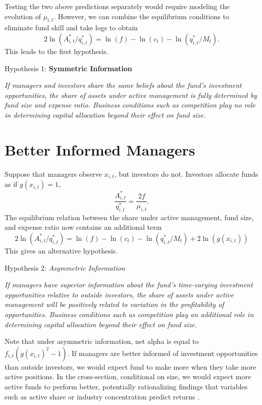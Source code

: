 \documentclass[openany]{book}
\theoremstyle{definition}
\theoremstyle{definition}
\theoremstyle{definition}
\theoremstyle{remark}
\begin{document}
Testing the two above predictions separately would require modeling the
evolution of \(\mu_{i,t}\). However, we can combine the equilibrium
conditions to eliminate fund skill and take logs to obtain
\begin{equation}
2\ln(A_{i,t}^\ast/q^\ast_{i,t})=\ln(f) - \ln(c_t) - \ln(q^\ast_{i,t}/M_t).
\label{eq:csEq}
\end{equation} This leads to the first hypothesis.

Hypothesis 1: \textbf{Symmetric Information}

\emph{If managers and investors share the same beliefs about the fund's
investment opportunities, the share of assets under active management is
fully determined by fund size and expense ratio. Business conditions
such as competition play no role in determining capital allocation
beyond their effect on fund size.}

\hypertarget{better-informed-managers}{%
\section{Better Informed Managers}\label{better-informed-managers}}

Suppose that managers observe \(x_{i,t}\), but investors do not.
Investors allocate funds as if \(g(x_{i,t})=1\), \begin{equation}
\frac{A_{i,t}^\ast}{q_{i,t}^\ast}=\frac{2f}{\mu_{i,t}}.
\end{equation} The equilibrium relation between the share under active
management, fund size, and expense ratio now contains an additional term
\begin{equation}
2\ln(A_{i,t}^\ast/q^\ast_{i,t})=\ln(f) - \ln(c_t) - \ln(q^\ast_{i,t}/M_t) + 2\ln(g(x_{i,t}))
\label{eq:csEQa}
\end{equation} This gives an alternative hypothesis.

Hypothesis 2: \emph{Asymmetric Information}

\emph{If managers have superior information about the fund's
time-varying investment opportunities relative to outside investors, the
share of assets under active management will be positively related to
variation in the profitability of opportunities. Business conditions
such as competition play an additional role in determining capital
allocation beyond their effect on fund size.}

Note that under asymmetric information, net alpha is equal to
\(f_{i,t}(g(x_{i,t})^2-1)\). If managers are better informed of
investment opportunities than outside investors, we would expect fund to
make more when they take more active positions. In the cross-section,
conditional on size, we would expect more active funds to perform
better, potentially rationalizing findings that variables such as active
share or industry concentration predict returns \citep{cp09, ksz05}.
\end{document}
